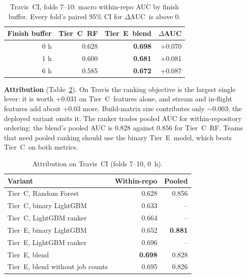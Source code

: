 \documentclass[conference]{IEEEtran}
\newcommand{\dAUC}{$\Delta$AUC}
\newcommand{\tierC}{Tier~C}
\newcommand{\tierE}{Tier~E}
\begin{document}
\begin{table}[t]
\caption{Travis~CI, folds 7--10: macro within-repo AUC by finish buffer. Every fold's paired 95\% CI for \dAUC\ is above 0.}
\label{tab:travis}
\centering
\footnotesize
\setlength{\tabcolsep}{4pt}
\begin{tabular}{@{}rrrr@{}}
\toprule
Finish buffer & \tierC\ RF & \tierE\ blend & \dAUC \\
\midrule
0 h & 0.628 & \textbf{0.698} & +0.070 \\
1 h & 0.600 & \textbf{0.681} & +0.081 \\
6 h & 0.585 & \textbf{0.672} & +0.087 \\
\bottomrule
\end{tabular}
\end{table}

\textbf{Attribution} (Table~\ref{tab:attr}). On Travis the ranking objective is the largest single lever: it is worth +0.031 on \tierC\ features alone, and stream and in-flight features add about +0.03 more. Build-matrix size contributes only $\sim$0.003; the deployed variant omits it. The ranker trades pooled AUC for within-repository ordering: the blend's pooled AUC is 0.828 against 0.856 for \tierC\ RF. Teams that need pooled ranking should use the binary \tierE\ model, which beats \tierC\ on both metrics.

\begin{table}[t]
\caption{Attribution on Travis~CI (folds 7--10, 0~h).}
\label{tab:attr}
\centering
\footnotesize
\setlength{\tabcolsep}{4pt}
\begin{tabular}{@{}lrr@{}}
\toprule
Variant & Within-repo & Pooled \\
\midrule
\tierC, Random Forest & 0.628 & 0.856 \\
\tierC, binary LightGBM & 0.633 & -- \\
\tierC, LightGBM ranker & 0.664 & -- \\
\tierE, binary LightGBM & 0.652 & \textbf{0.881} \\
\tierE, LightGBM ranker & 0.696 & -- \\
\tierE, blend & \textbf{0.698} & 0.828 \\
\tierE, blend without job counts & 0.695 & 0.826 \\
\bottomrule
\end{tabular}
\end{table}
\end{document}
